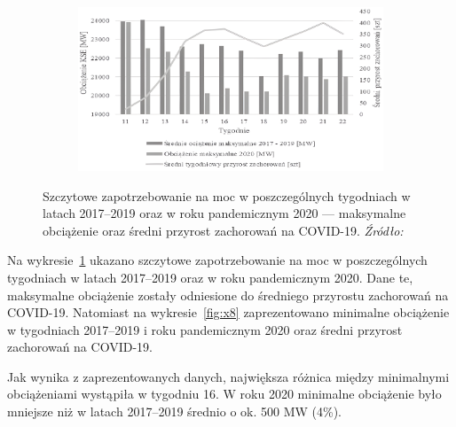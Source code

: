 \documentclass[polish, twoside, 12pt, a4paper]{article}
\theoremstyle{definition}
\theoremstyle{plain}
\theoremstyle{remark}
\begin{document}
\begin{figure}[hbt]
  \centering

  \begin{subfigure}[t]{0.45\textwidth}
    \hspace{-1.5cm}
    \includegraphics[width=1.4\textwidth]{./out_figures/figure_7}
  \end{subfigure}

  \captionsetup{margin=10pt,font=small,labelfont=bf,width=.8\textwidth}

  \caption[Szczytowe zapotrzebowanie na moc w poszczególnych tygodniach w latach 2017--2019 oraz w roku pandemicznym 2020]{Szczytowe zapotrzebowanie na moc w poszczególnych tygodniach w latach 2017--2019 oraz w roku pandemicznym 2020 --- maksymalne obciążenie oraz średni przyrost zachorowań na COVID-19. \textit{Źródło:} \cite{stahl2021}}\label{fig:x7}
\end{figure}

Na wykresie~\ref{fig:x7} ukazano szczytowe zapotrzebowanie na moc w poszczególnych tygodniach w latach 2017--2019 oraz w roku pandemicznym 2020. Dane te, maksymalne obciążenie zostały odniesione do średniego przyrostu zachorowań na COVID-19. Natomiast na wykresie~\ref{fig:x8} zaprezentowano minimalne obciążenie w tygodniach 2017--2019 i roku pandemicznym 2020 oraz średni przyrost zachorowań na COVID-19. 

Jak wynika z zaprezentowanych danych, największa różnica między minimalnymi obciążeniami wystąpiła w tygodniu 16. W roku 2020 minimalne obciążenie było mniejsze niż w latach 2017--2019 średnio o ok. 500 MW (4\%).
\end{document}
